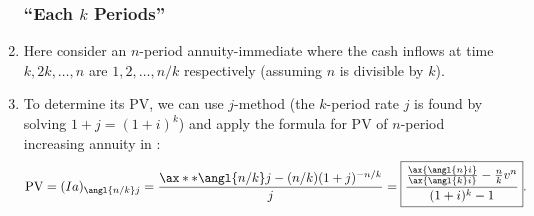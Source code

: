 \begin{enumerate}
\subsubsection*{``Each \(k\) Periods''}
\item Here consider an \(n\)-period annuity-immediate where the cash inflows at
time \(k,2k,\dotsc,n\) are \(1, 2,\dotsc,n/k\) respectively (assuming \(n\) is
divisible by \(k\)).
\item \label{it:pv-annuity-incr-each-k}
To determine its PV, we can use \(j\)-method (the \(k\)-period rate \(j\) is
found by solving \(1+j=(1+i)^k\)) and apply the formula for PV of \(n\)-period
increasing annuity in :
\[
\text{PV}=(Ia)_{\angl{n/k}j}=\frac{\ax**{\angl{n/k}j}-(n/k)(1+j)^{-n/k}}{j}
=\boxed{\frac{\frac{\ax{\angl{n}i}}{\ax{\angl{k}i}}-\frac{n}{k}v^n}{(1+i)^k-1}}.
\]


\end{enumerate}
